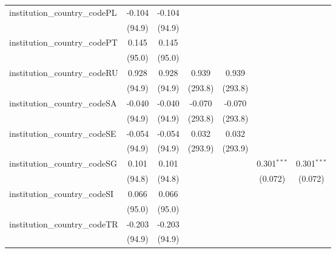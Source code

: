 \begin{tabular}{lcccccc}
   institution\_country\_codePL          & -0.104        & -0.104        &               &               &               &   \\   
                                         & (94.9)        & (94.9)        &               &               &               &   \\   
   institution\_country\_codePT          & 0.145         & 0.145         &               &               &               &   \\   
                                         & (95.0)        & (95.0)        &               &               &               &   \\   
   institution\_country\_codeRU          & 0.928         & 0.928         & 0.939         & 0.939         &               &   \\   
                                         & (94.9)        & (94.9)        & (293.8)       & (293.8)       &               &   \\   
   institution\_country\_codeSA          & -0.040        & -0.040        & -0.070        & -0.070        &               &   \\   
                                         & (94.9)        & (94.9)        & (293.8)       & (293.8)       &               &   \\   
   institution\_country\_codeSE          & -0.054        & -0.054        & 0.032         & 0.032         &               &   \\   
                                         & (94.9)        & (94.9)        & (293.9)       & (293.9)       &               &   \\   
   institution\_country\_codeSG          & 0.101         & 0.101         &               &               & 0.301$^{***}$ & 0.301$^{***}$\\   
                                         & (94.8)        & (94.8)        &               &               & (0.072)       & (0.072)\\   
   institution\_country\_codeSI          & 0.066         & 0.066         &               &               &               &   \\   
                                         & (95.0)        & (95.0)        &               &               &               &   \\   
   institution\_country\_codeTR          & -0.203        & -0.203        &               &               &               &   \\   
                                         & (94.9)        & (94.9)        &               &               &               &   \\   

\end{tabular}
